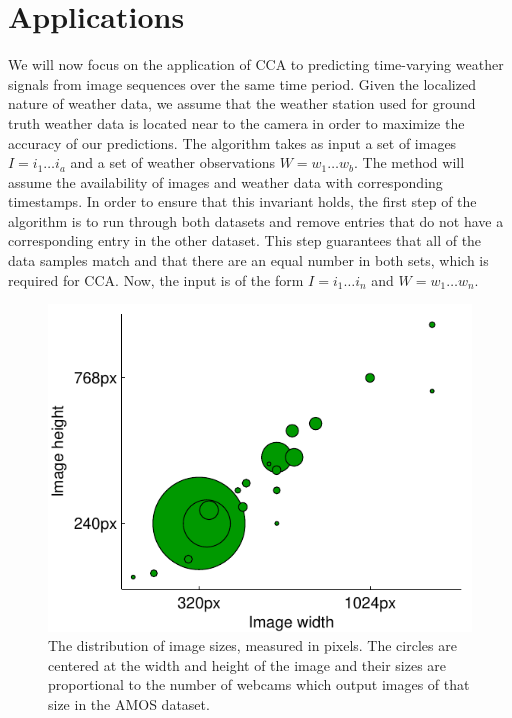 \section{Applications}
We will now focus on the application of CCA to predicting time-varying weather signals from image sequences over the same time period. Given the localized nature of weather data, we assume that the weather station used for ground truth weather data is located near to the camera in order to maximize the accuracy of our predictions. The algorithm takes as input a set of images $I=i_1\ldots i_a$ and a set of weather observations $W=w_1\ldots w_b$. The method will assume the availability of images and weather data with corresponding timestamps. In order to ensure that this invariant holds, the first step of the algorithm is to run through both datasets and remove entries that do not have a corresponding entry in the other dataset. This step guarantees that all of the data samples match and that there are an equal number in both sets, which is required for CCA. Now, the input is of the form $I=i_1\ldots i_n$ and $W=w_1\ldots w_n$.

\begin{figure}
	\centering
		\includegraphics{figures/imagedimensions.pdf}
	\caption{The distribution of image sizes, measured in pixels. The circles are centered at the width and height of the image and their sizes are proportional to the number of webcams which output images of that size in the AMOS dataset.}
	\label{fig:imagedimensions}
\end{figure}

